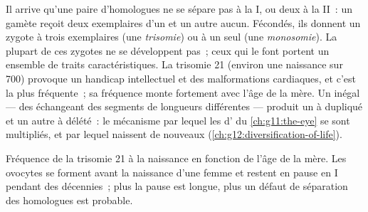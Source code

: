 \begin{proposition}\label{prop:g12:meiosis-genetic-shuffling:errors}
Il arrive qu'une paire d'homologues ne se sépare pas à la  I, ou
deux  à la  II~: un gamète reçoit deux exemplaires
d'un  et un autre aucun. Fécondés, ils donnent un zygote à
trois exemplaires (une \emph{trisomie}) ou à un seul (une
\emph{monosomie}). La plupart de ces zygotes ne se développent pas~;
ceux qui le font portent un ensemble de traits caractéristiques. La
trisomie 21 (environ une naissance sur 700) provoque un handicap
intellectuel et des malformations cardiaques, et c'est la plus
fréquente~; sa fréquence monte fortement avec l'âge de la mère. Un
 inégal --- des  échangeant des segments de
longueurs différentes --- produit un  à  dupliqué et un
autre à  délété~: le mécanisme par lequel les  d' du
\cref{ch:g11:the-eye} se sont multipliés, et par lequel naissent de
nouveaux  (\cref{ch:g12:diversification-of-life}).
\end{proposition}
\admitted

\begin{omfigure}

{\small Fréquence de la trisomie 21 à la naissance en fonction de l'âge
de la mère. Les ovocytes se forment avant la naissance d'une femme et
restent en pause en  I pendant des décennies~; plus la pause est
longue, plus un défaut de séparation des homologues est probable.}
\end{omfigure}

